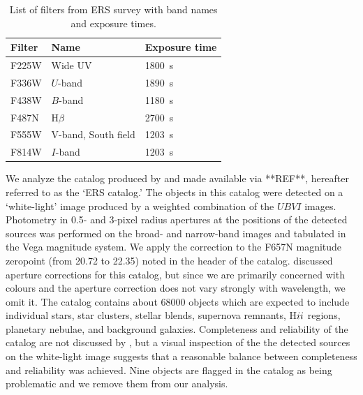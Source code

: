 \begin{table}
\centering
\caption{List of filters from ERS survey with band names and exposure times.}
\label{tab:filters}
\begin{tabular}{lll}
\hline\hline
Filter & Name & Exposure time\\
\hline
F225W &  Wide UV & 1800~s\\
F336W &  $U$-band & 1890~s\\ 
F438W &  $B$-band & 1180~s\\
F487N &  H$\beta$ & 2700~s\\
F555W &  V-band, South field & 1203~s\\
F814W &  $I$-band & 1203~s\\
\hline
\end{tabular}
\end{table}

We analyze the catalog produced by \citet{chandar10} and made available via **REF**, hereafter referred to as the `ERS catalog.'
The objects in this catalog were detected on a `white-light' image produced by a weighted combination of the $UBVI$ images.
Photometry in 0.5- and 3-pixel radius apertures at the positions of the detected sources was performed on the broad- and narrow-band images and tabulated in the Vega magnitude system. 
We apply the correction to the F657N magnitude zeropoint (from 20.72 to 22.35) noted in the header of the catalog.
\citet{chandar10} discussed aperture corrections for this catalog, but since we are primarily concerned with colours
and the aperture correction does not vary strongly with wavelength, we omit it.
The catalog contains about 68000 objects which are expected to include individual stars, star clusters, stellar blends,
supernova remnants, H${\sc ii}$ regions, planetary nebulae, and background galaxies.
Completeness and reliability of the catalog are not discussed by \citet{chandar10},
but a visual inspection of the the detected sources on the white-light image suggests that a reasonable balance
between completeness and reliability was achieved.
Nine objects are flagged in the catalog as being problematic 
and we remove them from our analysis.

